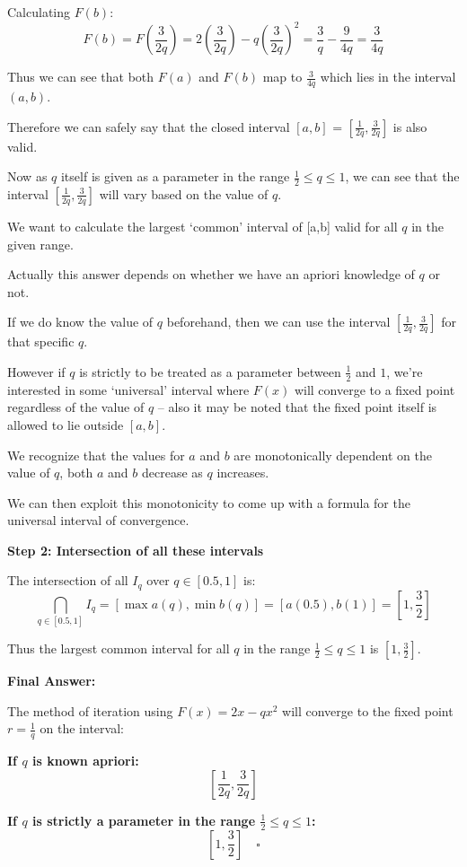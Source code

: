 Calculating $F(b)$:
$$F(b) = F\left(\frac{3}{2q}\right) = 2\left(\frac{3}{2q}\right) - q\left(\frac{3}{2q}\right)^2 = \frac{3}{q} - \frac{9}{4q} = \frac{3}{4q}$$

Thus we can see that both $F(a)$ and $F(b)$ map to $\frac{3}{4q}$ which lies in the interval $(a,b)$.

Therefore we can safely say that the closed interval $[a,b]$ = $\left[\frac{1}{2q}, \frac{3}{2q}\right]$ is also valid.

Now as $q$ itself is given as a parameter in the range $\frac{1}{2} \leq q \leq 1$, we can see that the interval $\left[\frac{1}{2q}, \frac{3}{2q}\right]$ will vary based on the value of $q$.

We want to calculate the largest `common' interval of [a,b] valid for all $q$ in the given range.

Actually this answer depends on whether we have an apriori knowledge of $q$ or not.

If we do know the value of $q$ beforehand, then we can use the interval $\left[\frac{1}{2q}, \frac{3}{2q}\right]$ for that specific $q$.

However if $q$ is strictly to be treated as a parameter between $\frac{1}{2}$ and $1$, we're interested in some `universal' interval where $F(x)$ will converge to a fixed point regardless of the value of $q$ -- also it may be noted that the fixed point itself is allowed to lie outside $[a, b]$. 

We recognize that the values for $a$ and $b$ are monotonically dependent on the value of $q$, both $a$ and $b$ decrease as $q$ increases. 

We can then exploit this monotonicity to come up with a formula for the universal interval of convergence.

\textbf{Step 2: Intersection of all these intervals}

The intersection of all $I_q$ over $q \in [0.5, 1]$ is:
$$\bigcap_{q \in [0.5,1]} I_q = [\max a(q), \min b(q)] = [a(0.5), b(1)] = \left[1, \frac{3}{2}\right]$$


Thus the largest common interval for all $q$ in the range $\frac{1}{2} \leq q \leq 1$ is $\left[1, \frac{3}{2}\right]$.



\textbf{Final Answer:}

The method of iteration using $F(x) = 2x - qx^2$ will converge to the fixed point $r = \frac{1}{q}$ on the interval:

\textbf{If $q$ is known apriori:}
$$\boxed{\left[\frac{1}{2q}, \frac{3}{2q}\right]}$$

\textbf{If $q$ is strictly a parameter in the range $\frac{1}{2} \leq q \leq 1$:}
$$\boxed{\left[1, \frac{3}{2}\right]} \quad \square$$